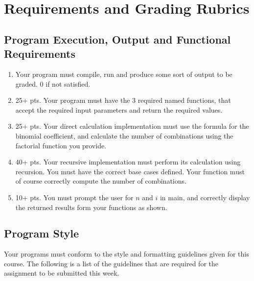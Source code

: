 \documentclass[11pt]{article}
\begin{document}
\section*{Requirements and Grading Rubrics}
\label{sec-5}

\subsection*{Program Execution, Output and Functional Requirements}
\label{sec-5-1}

\begin{enumerate}
\item Your program must compile, run and produce some sort of output to be
graded. 0 if not satisfied.
\item 25+ pts.  Your program must have the 3 required named functions,
that accept the required input parameters and return the required
values.
\item 25+ pts. Your direct calculation implementation must use the formula
for the binomial coefficient, and calculate the number of combinations
using the factorial function you provide.
\item 40+ pts. Your recursive implementation must perform its calculation using
recursion.  You must have the correct base cases defined.  Your function must
of course correctly compute the number of combinations.
\item 10+ pts. You must prompt the user for $n$ and $i$ in main, and correctly display
the returned results form your functions as shown.
\end{enumerate}

\subsection*{Program Style}
\label{sec-5-2}

Your programs must conform to the style and formatting guidelines
given for this course.  The following is a list of the guidelines that
are required for the assignment to be submitted this week.
\end{document}
